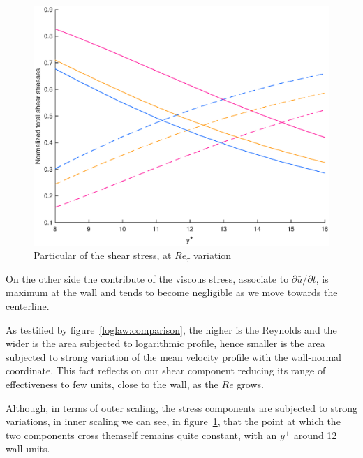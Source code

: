 \begin{figure}
\begin{center}
\includegraphics[scale=0.55]{grafici/y12.eps}
\caption{Particular of the shear stress, at $Re_{\tau}$ variation}
\label{y12}
\end{center}
\end{figure}

On the other side the contribute of the viscous stress, associate to $\partial{\bar{u}}/\partial{t}$, is maximum at the wall and tends to become negligible as we move towards the centerline. \par
As testified by figure~\ref{loglaw:comparison}, the higher is the Reynolds and the wider is the area subjected to logarithmic profile, hence smaller is the area subjected to strong variation of the mean velocity profile with the wall-normal coordinate. This fact reflects on our shear component reducing its range of effectiveness to few units, close to the wall, as the $Re$ grows.\par
Although, in terms of outer scaling, the stress components are subjected to strong variations, in inner scaling we can see, in figure~\ref{y12}, that the point at which the two components cross themself remains quite constant, with an $y^{+}$ around 12 wall-units.\\~\par



